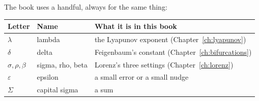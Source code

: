 \noindent
The book uses a handful, always for the same thing:

\begin{center}
\begin{tabular}{lll}
\toprule
Letter & Name & What it is in this book \\
\midrule
$\lambda$ & lambda & the Lyapunov exponent (Chapter~\ref{ch:lyapunov}) \\
$\delta$ & delta & Feigenbaum's constant (Chapter~\ref{ch:bifurcations}) \\
$\sigma, \rho, \beta$ & sigma, rho, beta & Lorenz's three settings (Chapter~\ref{ch:lorenz}) \\
$\varepsilon$ & epsilon & a small error or a small nudge \\
$\Sigma$ & capital sigma & a sum \\
\bottomrule
\end{tabular}
\end{center}
